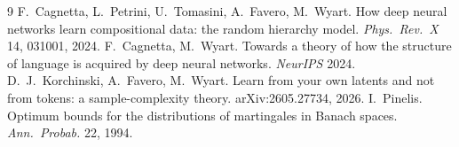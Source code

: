 \documentclass[11pt]{article}
\theoremstyle{definition}
\begin{document}
\begin{thebibliography}{9}\small
{} F.~Cagnetta, L.~Petrini, U.~Tomasini, A.~Favero, M.~Wyart. How deep neural networks learn compositional data: the random hierarchy model. \emph{Phys.\ Rev.\ X} 14, 031001, 2024.
 F.~Cagnetta, M.~Wyart. Towards a theory of how the structure of language is acquired by deep neural networks. \emph{NeurIPS} 2024.
 D.~J.~Korchinski, A.~Favero, M.~Wyart. Learn from your own latents and not from tokens: a sample-complexity theory. arXiv:2605.27734, 2026.
 I.~Pinelis. Optimum bounds for the distributions of martingales in Banach spaces. \emph{Ann.\ Probab.} 22, 1994.
\end{thebibliography}
\end{document}
